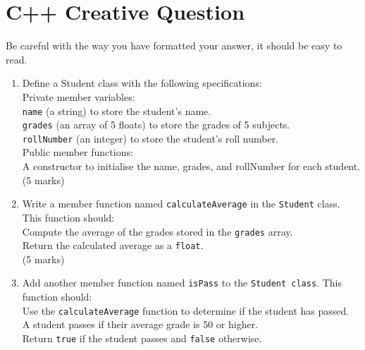 \documentclass[a4paper,12pt]{article}
\begin{document}
\section{C++ Creative Question}

Be careful with the way you have formatted your answer, it should be easy to read.

\begin{enumerate}
    \item Define a Student class with the following specifications:\\

    Private member variables:\\
        \verb|name| (a string) to store the student's name.\\
        \verb|grades| (an array of 5 floats) to store the grades of 5 subjects.\\
        \verb|rollNumber| (an integer) to store the student's roll number.\\
        
    Public member functions:\\
        A constructor to initialise the name, grades, and rollNumber for each student.\\
        
    (5 marks)\\

    \item Write a member function named \verb|calculateAverage| in the \verb|Student| class. This function should:\\

        Compute the average of the grades stored in the \verb|grades| array.\\
        Return the calculated average as a \verb|float|.\\
        
    (5 marks)\\
    
    \item Add another member function named \verb|isPass| to the \verb|Student class|. This function should:\\

    Use the \verb|calculateAverage| function to determine if the student has passed.\\
        A student passes if their average grade is 50 or higher.\\
        Return \verb|true| if the student passes and \verb|false| otherwise.\\


\end{enumerate}
\end{document}
